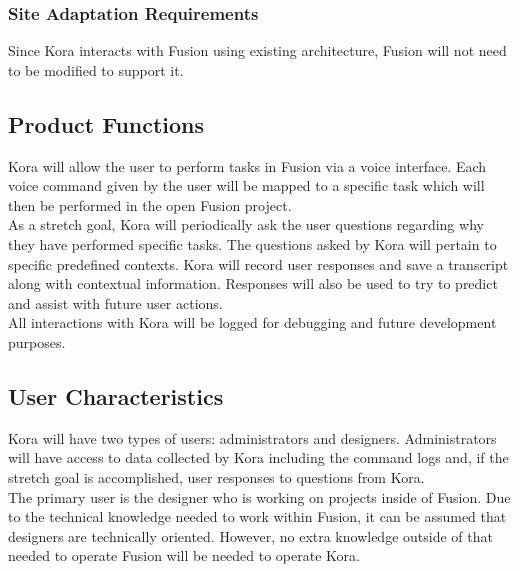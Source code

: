 \documentclass[onecolumn, draftclsnofoot,10pt, compsoc]{IEEEtran}
\def \botname{Kora\xspace}
\begin{document}

        \subsubsection{Site Adaptation Requirements} 
            Since \botname interacts with Fusion using existing architecture, Fusion will not need to be modified to support it. 

    \subsection{Product Functions}
        \botname will allow the user to perform tasks in Fusion via a voice interface. 
        Each voice command given by the user will be mapped to a specific task which will then be performed in the open Fusion project. \\
       
        As a stretch goal, \botname will periodically ask the user questions regarding why they have performed specific tasks.
        The questions asked by \botname will pertain to specific predefined contexts.
		\botname will record user responses and save a transcript along with contextual information.
        Responses will also be used to try to predict and assist with future user actions. \\

        All interactions with \botname will be logged for debugging and future development purposes.
        
    \subsection{User Characteristics}
		\botname will have two types of users: administrators and designers. 
		Administrators will have access to data collected by \botname including the command logs and, if the stretch goal is accomplished, user responses to questions from \botname. \\
		
		The primary user is the designer who is working on projects inside of Fusion. 
        Due to the technical knowledge needed to work within Fusion, it can be assumed that designers are technically oriented.
        However, no extra knowledge outside of that needed to operate Fusion will be needed to operate \botname.
        
\end{document}
